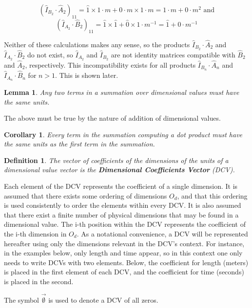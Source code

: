 \documentclass[10pt,letterpaper]{article}
\newtheorem{defn}{Definition}[section]
\newtheorem{lem}{Lemma}[section]
\newtheorem{cor}{Corollary}[section]
\numberwithin{equation}{section}
\begin{document}
\[ (\hat I_{B_2} \cdot \hat A_2)_{11} = \hat 1 \times 1 \cdot m + 0 \cdot m \times 1 \cdot m = 1 \cdot m + 0 \cdot m^2 \mbox{ and} \]
\[(\hat I_{A_2} \cdot \hat B_2)_{11} = \hat 1 \times \hat 1 + \hat 0 \times 1 \cdot m^{-1} = \hat 1 + 0 \cdot m^{-1} \]

Neither of these calculations makes any sense, so the products $\hat I_{B_2} \cdot \hat A_2$ and $\hat I_{A_2} \cdot \hat B_2$ do not exist, so $\hat I_{A_2}$ and $\hat I_{B_2}$ are not identity matrices compatible with $\hat B_2$ and $\hat A_2$, respectively.  This incompatibility exists for all products $\hat I_{B_n} \cdot \hat A_n$ and $\hat I_{A_n} \cdot \hat B_n$ for $n > 1$.  This is shown later.

\begin{lem} \label{terms_of_a_summation_have_equal_units} Any two terms in a summation over dimensional values must have the same units.\end{lem}

The above must be true by the nature of addition of dimensional values.

\begin{cor}Every term in the summation computing a dot product must have the same units as the first term in the summation.\end{cor}

\begin{defn}The vector of coefficients of the dimensions of the units of a dimensional value vector is the \textbf{Dimensional Coefficients Vector} (DCV).\end{defn}

Each element of the DCV represents the coefficient of a single dimension.  It is assumed that there exists some ordering of dimensions $O_d$, and that this ordering is used consistently to order the elements within every DCV.  It is also assumed that there exist a finite number of physical dimensions that may be found in a dimensional value.  The i-th position within the DCV represents the coefficient of the i-th dimension in $O_d$.  As a notational convenience, a DCV will be represented hereafter using only the dimensions relevant in the DCV's context.  For instance, in the examples below, only length and time appear, so in this context one only needs to write DCVs with two elements.  Below, the coefficient for length (meters) is placed in the first element of each DCV, and the coefficient for time (seconds) is placed in the second.

The symbol $\vec{\emptyset}$ is used to denote a DCV of all zeros.
\end{document}
